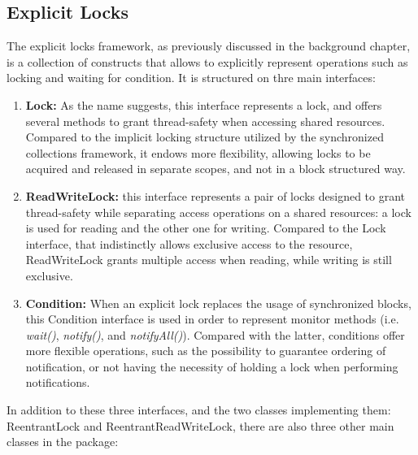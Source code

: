 \documentclass[]{usiinfthesis}
\begin{document}
\subsection{Explicit Locks}
The explicit locks framework, as previously discussed in the background chapter, is a collection of constructs that allows to explicitly represent operations such as locking and waiting for condition. It is structured on thre main interfaces:
\begin{enumerate}
    \item \textbf{Lock:} As the name suggests, this interface represents a lock, and offers several methods to grant thread-safety when accessing shared resources. Compared to the implicit locking structure utilized by the synchronized collections framework, it endows more flexibility, allowing locks to be acquired and released in separate scopes, and not in a block structured way.  
    \item \textbf{ReadWriteLock:} this interface represents a pair of locks designed to grant thread-safety while separating access operations on a shared resources: a lock is used for reading and the other one for writing. Compared to the Lock interface, that indistinctly allows exclusive access to the resource, ReadWriteLock grants multiple access when reading, while writing is still exclusive.
    \item \textbf{Condition:} When an explicit lock replaces the usage of synchronized blocks, this Condition interface is used in order to represent monitor methods (i.e. \textit{wait()}, \textit{notify()}, and \textit{notifyAll()}). Compared with the latter, conditions offer more flexible operations, such as the possibility to guarantee ordering of notification, or not having the necessity of holding a lock when performing notifications.
\end{enumerate}

\noindent
In addition to these three interfaces, and the two classes implementing them: ReentrantLock and ReentrantReadWriteLock, there are also three other main classes in the package:
\end{document}
